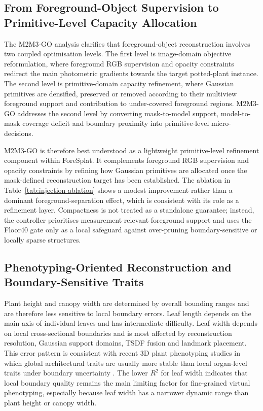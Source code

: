 \documentclass[a4paper]{cas-sc}
\begin{document}
\subsection{From Foreground-Object Supervision to Primitive-Level Capacity Allocation}\label{sec:primitive-level-capacity-allocation}

The M2M3-GO analysis clarifies that foreground-object reconstruction involves two coupled optimisation levels. The first level is image-domain objective reformulation, where foreground RGB supervision and opacity constraints redirect the main photometric gradients towards the target potted-plant instance. The second level is primitive-domain capacity refinement, where Gaussian primitives are densified, preserved or removed according to their multiview foreground support and contribution to under-covered foreground regions. M2M3-GO addresses the second level by converting mask-to-model support, model-to-mask coverage deficit and boundary proximity into primitive-level micro-decisions.

M2M3-GO is therefore best understood as a lightweight primitive-level refinement component within ForeSplat. It complements foreground RGB supervision and opacity constraints by refining how Gaussian primitives are allocated once the mask-defined reconstruction target has been established. The ablation in Table~\ref{tab:injection-ablation} shows a modest improvement rather than a dominant foreground-separation effect, which is consistent with its role as a refinement layer. Compactness is not treated as a standalone guarantee; instead, the controller prioritises measurement-relevant foreground support and uses the Floor40 gate only as a local safeguard against over-pruning boundary-sensitive or locally sparse structures.


\subsection{Phenotyping-Oriented Reconstruction and Boundary-Sensitive Traits}\label{sec:phenotyping-boundary-errors}

Plant height and canopy width are determined by overall bounding ranges and are therefore less sensitive to local boundary errors. Leaf length depends on the main axis of individual leaves and has intermediate difficulty. Leaf width depends on local cross-sectional boundaries and is most affected by reconstruction resolution, Gaussian support domains, TSDF fusion and landmark placement. This error pattern is consistent with recent 3D plant phenotyping studies in which global architectural traits are usually more stable than local organ-level traits under boundary uncertainty \cite{ref57,ref58}. The lower \(R^2\) for leaf width indicates that local boundary quality remains the main limiting factor for fine-grained virtual phenotyping, especially because leaf width has a narrower dynamic range than plant height or canopy width.
\end{document}
